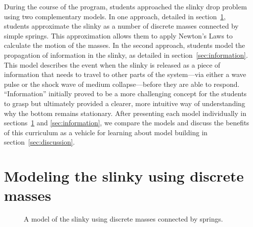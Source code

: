 \documentclass[prb,preprint,superscriptaddress]{revtex4-1}
\renewcommand{\sec}[1]{section~\ref{sec:#1}}
\newcommand{\secs}[2]{sections~\ref{sec:#1} and \ref{sec:#2}}
\begin{document}
During the course of the program, students approached the slinky drop problem using two complementary models.
In one approach, detailed in \sec{forces}, students approximate
the slinky as a number of discrete masses connected by simple springs. This approximation allows them to apply
 Newton's Laws to calculate the motion of the masses.
In the second
approach, students model the propagation of information in the slinky, as detailed in \sec{information}. This model
describes the event when the slinky is released as a piece of information that
needs to travel to other parts of the system---via either a wave pulse or the shock wave of medium collapse---before they are able to respond.
``Information'' initially proved to be a more challenging concept for the
students to grasp but ultimately provided a clearer, more intuitive way of understanding why the bottom
remains stationary. After presenting each
model individually in \secs{forces}{information}, we compare the models and
discuss the benefits of this curriculum as a vehicle for learning about model building in \sec{discussion}.

\section{Modeling the slinky using discrete masses}
\label{sec:forces}

\begin{figure}[t]
\centering


\caption{A model of the slinky using discrete masses connected by springs.}
\label{fig:discrete}
\end{figure}
\end{document}
